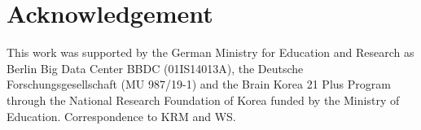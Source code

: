 \documentclass[runningheads]{llncs}
\begin{document}
\section*{Acknowledgement}
This work was supported by the German Ministry for Education and Research as Berlin Big Data Center BBDC (01IS14013A), the Deutsche Forschungsgesellschaft (MU 987/19-1) and the Brain Korea 21 Plus Program through the National Research Foundation of Korea funded by the Ministry of Education. Correspondence to KRM and WS.



\end{document}
